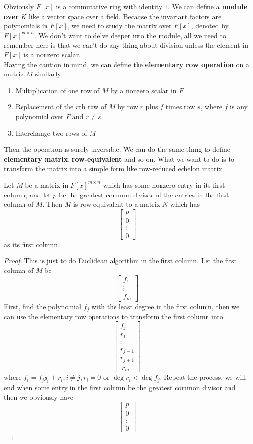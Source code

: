 \documentclass{article}
\begin{document}
Obviously $F[x]$ is a commutative ring with identity $1$. We can define a \textbf{module over} $K$ like a vector space over a field. Because the invariant factors are polynomials in $F[x]$, we need to study the matrix over $F[x]$, denoted by $F[x]^{m\times n}$. We don't want to delve deeper into the module, all we need to remember here is that we can't do any thing about division unless the element in $F[x]$ is a nonzero scalar.\\
\indent Having the caution in mind, we can define the \textbf{elementary row operation} on a matrix $M$ similarly:
\begin{enumerate}
	\item Multiplication of one row of $M$ by a nonzero scalar in $F$
	\item Replacement of the $r$th row of $M$ by row $r$ plus $f$ times row $s$, where $f$ is any polynomial over $F$ and $r\neq s$
	\item Interchange two rows of $M$
\end{enumerate}
Then the operation is surely inversible. We can do the same thing to define \textbf{elementary matrix}, \textbf{row-equivalent} and so on. What we want to do is to transform the matrix into a simple form like row-reduced echelon matrix.
\begin{lem}
	Let $M$ be a matrix in $F[x]^{m\times n}$ which has some nonzero entry in its first column, and let $p$ be the greatest common divisor of the entries in the first column of $M$. Then $M$ is row-equivalent to a matrix $N$ which has
	\[\begin{bmatrix}
		p\\
		0\\
		\vdots\\
		0
	\end{bmatrix}\]
	as its first column
\end{lem}
\begin{proof}
	This is just to do Euclidean algorithm in the first column. Let the first column of $M$ be
	\[\begin{bmatrix}
		f_1\\
		\vdots\\
		f_m
	\end{bmatrix}\]
	First, find the polynomial $f_j$ with the least degree in the first column, then we can use the elementary row operations to transform the first column into
	\[\begin{bmatrix}
		f_j\\
		r_1\\
		\vdots\\
		r_{j-1}\\
		r_{j+1}\\
		\vdots
		r_m
	\end{bmatrix}\]
	where $f_i=f_jg_i+r_i,i\neq j,r_i=0\text{ or }\deg r_i<\deg f_j$. Repeat the process, we will end when some entry in the first column be the greatest common divisor and then we obviously have
	\[\begin{bmatrix}
		p\\
		0\\
		\vdots\\
		0
	\end{bmatrix}\]
\end{proof}
\end{document}

